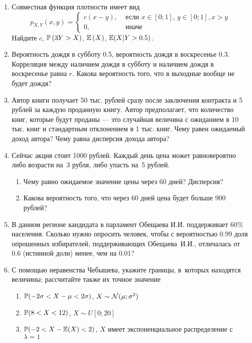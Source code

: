 \begin{enumerate}
\item Совместная функция плотности имеет вид
\[
p_{X,Y} \left(x,y\right)=
\begin{cases}
  c(x-y), & \text{ если } x\in \left[0;1\right],\, y\in \left[0;1\right], x>y \\
  0, & \text{ иначе}
\end{cases}
\]
Найдите  $c$, $\P\left(3Y>X\right)$,  $\E\left(X\right)$, $\E(X|Y>0.5)$.

\item Вероятность дождя в субботу 0.5, вероятность дождя в воскресенье 0.3. Корреляция между наличием дождя в субботу и наличием дождя в воскресенье равна $r$.
Какова вероятность того, что в выходные вообще не будет дождя?

\item Автор книги получает 50 тыс. рублей сразу после заключения
контракта и 5 рублей за каждую проданную книгу. Автор
предполагает, что количество книг, которые будут проданы — это
случайная величина с ожиданием в 10 тыс. книг и стандартным
отклонением в 1 тыс. книг. Чему равен ожидаемый доход автора? Чему
равна дисперсия дохода автора?

\item Сейчас акция стоит 1000 рублей. Каждый день цена может равновероятно либо возрасти на~3 рубля, либо упасть на~5 рублей.
\begin{enumerate}
\item Чему равно ожидаемое значение цены через 60 дней? Дисперсия?
\item Какова вероятность того, что через 60 дней цена будет больше 900 рублей?
\end{enumerate}


\item В данном регионе кандидата в парламент Обещаева И.И.
поддерживает 60\% населения. Сколько нужно опросить человек, чтобы
с вероятностью 0.99 доля  опрошенных избирателей, поддерживающих
Обещаева~И.И.,  отличалась от 0.6 (истинной доли) менее, чем на
0.01?

\item С помощью неравенства Чебышева, укажите границы, в~которых
находятся величины; рассчитайте также их точное значение
\begin{enumerate}
\item  $\P(-2\sigma<X-\mu<2\sigma)$, $X\sim \cN(\mu;\sigma^{2})$
\item  $\P(8<X<12)$, $X\sim U[0;20]$
\item $\P(-2<X-\E(X)<2)$, $X$ имеет экспоненциальное распределение с
$\lambda=1$
\end{enumerate}
\end{enumerate}

